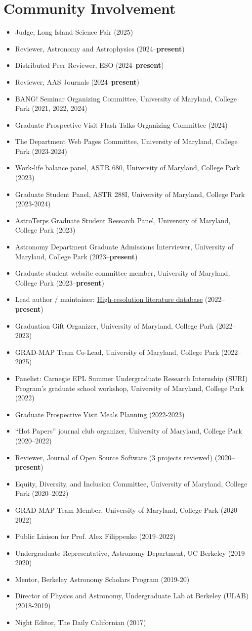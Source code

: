\documentclass[letterpaper,10.5pt]{article}
\newcommand{\resumeItem}[2]{
  \item\small{
    \textbf{#1}{#2 \vspace{-2pt}}
  }
}
\newcommand{\resumeItemListStart}{\begin{itemize}}
\newcommand{\resumeItemListEnd}{\end{itemize}\vspace{-5pt}}
\newcommand{\shorterSection}[1]{\vspace{-10pt}\section{#1}}
\begin{document}
\shorterSection{Community Involvement}
\resumeItemListStart
\resumeItem{}{Judge, Long Island Science Fair (2025)}
\resumeItem{}{Reviewer, Astronomy and Astrophysics (2024--\textbf{present})}
\resumeItem{}{Distributed Peer Reviewer, ESO (2024--\textbf{present})}
\resumeItem{}{Reviewer, AAS Journals (2024--\textbf{present})}
\resumeItem{}{BANG! Seminar Organizing Committee, University of Maryland, College Park (2021, 2022, 2024)}
\resumeItem{}{Graduate Prospective Visit Flash Talks Organizing Committee (2024)}
\resumeItem{}{The Department Web Pages Committee, University of Maryland, College Park (2023-2024)}
\resumeItem{}{Work-life balance panel, ASTR 680, University of Maryland, College Park (2023)}
\resumeItem{}{Graduate Student Panel, ASTR 288I, University of Maryland, College Park (2023-2024)}
\resumeItem{}{AstroTerps Graduate Student Research Panel, University of Maryland, College Park (2023)}
\resumeItem{}{Astronomy Department Graduate Admissions Interviewer, University of Maryland, College Park (2023--\textbf{present})}
\resumeItem{}{Graduate student website committee member, University of Maryland, College Park (2023--\textbf{present})}
\resumeItem{}{Lead author / maintainer: \href{https://www.arjunsavel.com/hires_papers.html}{High-resolution literature database} (2022--\textbf{present})}
\resumeItem{}{Graduation Gift Organizer, University of Maryland, College Park (2022--2023)}
\resumeItem{}{GRAD-MAP Team Co-Lead, University of Maryland, College Park (2022--2025)}
\resumeItem{}{Panelist: Carnegie EPL Summer Undergraduate Research Internship (SURI) Program’s graduate school workshop, University of Maryland, College Park (2022)}
\resumeItem{}{Graduate Prospective Visit Meals Planning (2022-2023)}
\resumeItem{}{``Hot Papers'' journal club organizer, University of Maryland, College Park (2020--2022)}
\resumeItem{}{Reviewer, Journal of Open Source Software (3 projects reviewed) (2020--\textbf{present})}
\resumeItem{}{Equity, Diversity, and Inclusion Committee, University of Maryland, College Park (2020--2022)}
\resumeItem{}{GRAD-MAP Team Member, University of Maryland, College Park (2020--2022)}
\resumeItem{}{Public Liaison for Prof. Alex Filippenko (2019--2022)}
\resumeItem{}{Undergraduate Representative, Astronomy Department, UC Berkeley (2019-2020)}
\resumeItem{}{Mentor, Berkeley Astronomy Scholars Program (2019-20)}
\resumeItem{}{Director of Physics and Astronomy, Undergraduate Lab at Berkeley (ULAB) (2018-2019)}
\resumeItem{}{Night Editor, The Daily Californian (2017)}
\resumeItemListEnd
\end{document}
